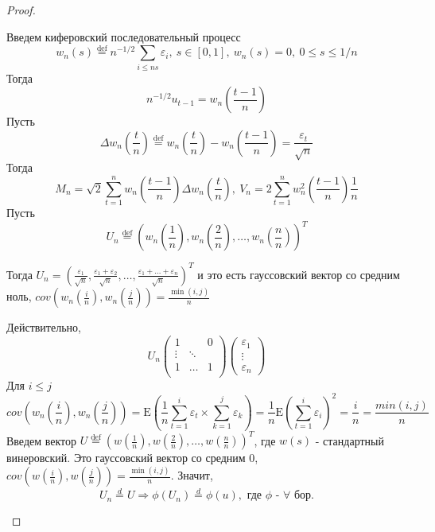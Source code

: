 \documentclass[12pt]{article}
\newcommand*{\defeq}{\stackrel{\text{def}}{=}}
\def\eps{ \varepsilon }
\def\E{ \mathrm{E} }
\begin{document}
\begin{proof}
\begin{enumerate}
        Введем киферовский последовательный процесс
        \[w_n(s)\defeq n^{-1/2}\sum_{i\leq ns}\eps_i,\ s\in[0,1],\ w_n(s)=0,\ 0\leq s\leq 1/n\]
        Тогда 
        \[n^{-1/2}u_{t-1}=w_n\left(\frac{t-1}{n}\right)\]
        Пусть
        \[\Delta w_n\left(\frac{t}{n}\right)\defeq w_n\left(\frac{t}{n}\right)-w_n\left(\frac{t-1}{n}\right)=\frac{\eps_t}{\sqrt{n}}\]
        Тогда
        \[M_n=\sqrt{2}\sum_{t=1}^nw_n\left(\frac{t-1}{n}\right)\Delta w_n\left(\frac{t}{n}\right),\ V_n=2\sum_{t=1}^nw_n^2\left(\frac{t-1}{n}\right)\frac{1}{n}\]
        Пусть
        \[U_n\defeq \left(w_n\left(\frac{1}{n}\right), w_n\left(\frac{2}{n}\right),\ldots,w_n\left(\frac{n}{n}\right)\right)^T\]
        \begin{leftbar}
            Тогда $U_n=\left(\frac{\eps_1}{\sqrt{n}},\frac{\eps_1+\eps_2}{\sqrt{n}},\ldots,\frac{\eps_1+\ldots+\eps_n}{\sqrt{n}}\right)^T$
            и это есть гауссовский вектор со средним ноль, $cov\left(w_n\left(\frac{i}{n}\right),w_n\left(\frac{j}{n}\right)\right)=\frac{\min(i,j)}{n}$
        \end{leftbar}
        Действительно,
        \[U_n\begin{pmatrix}
            1      &        & 0 \\
            \vdots & \ddots &    \\
            1      & \ldots &  1 \\
        \end{pmatrix}\begin{pmatrix}
            \eps_1  \\ \vdots \\ \eps_n
        \end{pmatrix}\]
        Для $i\leq j$
        \[cov\left(w_n\left(\frac{i}{n}\right),w_n\left(\frac{j}{n}\right)\right)=\E\left(\frac{1}{n}\sum_{t=1}^i\eps_t\times\sum_{k=1}^j\eps_k\right)=\frac{1}{n}\E\left(\sum_{t=1}^i\eps_i\right)^2=\frac{i}{n}=\frac{min(i,j)}{n}\]
        Введем вектор $U\defeq\left(w\left(\frac{1}{n}\right),w\left(\frac{2}{n}\right),\ldots,w\left(\frac{n}{n}\right)\right)^T$,
        где $w(s)$ - стандартный винеровский. Это гауссовский вектор со средним 0,
        $cov\left(w\left(\frac{i}{n}\right),w\left(\frac{j}{n}\right)\right)=\frac{\min(i,j)}{n}$.
        Значит,
        \begin{equation}\label{eq::U_almosteq}
            U_n\overset{d}{=}U \Rightarrow \phi(U_n)\overset{d}{=}\phi(u),\text{ где $\phi$ - $\forall$ бор.}
        \end{equation}
        \begin{leftbar}

\end{leftbar}
\end{enumerate}
\end{proof}
\end{document}
